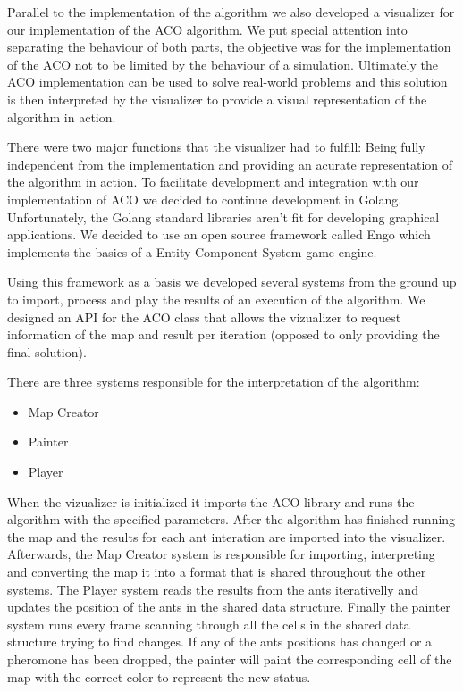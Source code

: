 \documentclass[times, 10pt,twocolumn]{article}
\begin{document}

         Parallel to the implementation of the algorithm we also developed a visualizer for
    our implementation of the ACO algorithm. We put special attention into separating the
    behaviour of both parts, the objective was for the implementation of the ACO not to
    be limited by the behaviour of a simulation. Ultimately the ACO implementation can
    be used to solve real-world problems and this solution is then interpreted by the visualizer
    to provide a visual representation of the algorithm in action.
    


        There were two major functions that the visualizer had to fulfill: Being fully 
    independent from the implementation and providing an acurate representation of the algorithm
    in action. To facilitate development and integration with our implementation of ACO we 
    decided to continue development in Golang. Unfortunately, the Golang standard libraries
    aren't fit for developing graphical applications. We decided to use an open source framework
    called Engo which implements the basics of a Entity-Component-System game engine. 

        Using this framework as a basis we developed several systems from the ground up 
    to import, process and play the results of an execution of the algorithm. We designed
    an API for the ACO class that allows the vizualizer to request information of the map and
    result per iteration (opposed to only providing the final solution). 

        There are three systems responsible for the interpretation of the algorithm:

    \begin{itemize}
        \item Map Creator
        \item Painter
        \item Player
    \end{itemize}

        When the vizualizer is initialized it imports the ACO library and runs the algorithm 
    with the specified parameters. After the algorithm has finished running the map and
    the results for each ant interation are imported into the visualizer. Afterwards, the Map Creator
    system is responsible for importing, interpreting and converting the map it into a format that is 
    shared throughout the other systems. The Player system reads the results from the ants iterativelly
    and updates the position of the ants in the shared data structure. Finally the painter system
    runs every frame scanning through all the cells in the shared data structure trying to find
    changes. If any of the ants positions has changed or a pheromone has been dropped, the painter
    will paint the corresponding cell of the map with the correct color to represent the new status.
\end{document}
